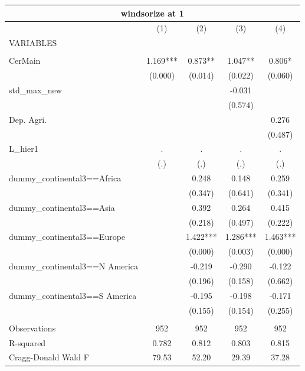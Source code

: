 \begin{tabular}{lcccc}
\multicolumn{5}{c}{windsorize at 1} \\ \hline
 & (1) & (2) & (3) & (4) \\
VARIABLES &  &  &  &  \\ \hline
 &  &  &  &  \\
CerMain & 1.169*** & 0.873** & 1.047** & 0.806* \\
 & (0.000) & (0.014) & (0.022) & (0.060) \\
std\_max\_new &  &  & -0.031 &  \\
 &  &  & (0.574) &  \\
Dep. Agri. &  &  &  & 0.276 \\
 &  &  &  & (0.487) \\
L\_hier1 & . & . & . & . \\
 & (.) & (.) & (.) & (.) \\
dummy\_continental3==Africa &  & 0.248 & 0.148 & 0.259 \\
 &  & (0.347) & (0.641) & (0.341) \\
dummy\_continental3==Asia &  & 0.392 & 0.264 & 0.415 \\
 &  & (0.218) & (0.497) & (0.222) \\
dummy\_continental3==Europe &  & 1.422*** & 1.286*** & 1.463*** \\
 &  & (0.000) & (0.003) & (0.000) \\
dummy\_continental3==N America &  & -0.219 & -0.290 & -0.122 \\
 &  & (0.196) & (0.158) & (0.662) \\
dummy\_continental3==S America &  & -0.195 & -0.198 & -0.171 \\
 &  & (0.155) & (0.154) & (0.255) \\
 &  &  &  &  \\
Observations & 952 & 952 & 952 & 952 \\
R-squared & 0.782 & 0.812 & 0.803 & 0.815 \\
 Cragg-Donald Wald F & 79.53 & 52.20 & 29.39 & 37.28 \\ \hline
\end{tabular}
